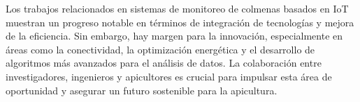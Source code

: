 Los trabajos relacionados en sistemas de monitoreo de colmenas basados en IoT muestran un progreso notable en términos de integración de tecnologías y mejora de la eficiencia. Sin embargo, hay margen para la innovación, especialmente en áreas como la conectividad, la optimización energética y el desarrollo de algoritmos más avanzados para el análisis de datos. La colaboración entre investigadores, ingenieros y apicultores es crucial para impulsar esta área de oportunidad y asegurar un futuro sostenible para la apicultura.
